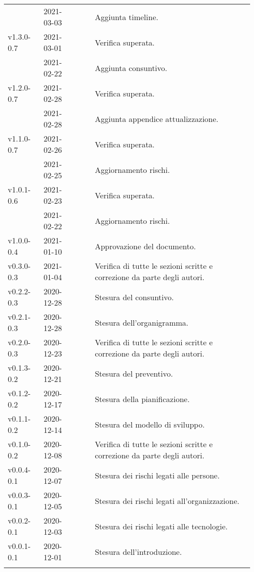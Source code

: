 {\begin{longtable}{C{.131777\freewidth} C{.134036\freewidth} C{.263554\freewidth} C{.188254\freewidth} C{.282379\freewidth}}
		& 2021-03-03 & \Daniele{} & \ana{} & Aggiunta timeline. \\
		v1.3.0-0.7 & 2021-03-01 & \Giosue{} & \ver{} & Verifica superata. \\
		& 2021-02-22 & \Daniele{} & \ana{} & Aggiunta consuntivo. \\
		v1.2.0-0.7 & 2021-02-28 & \Davide{} & \ana{} & Verifica superata. \\
		& 2021-02-28 & \Lucrezia{} & \ana{} & Aggiunta appendice attualizzazione. \\
		v1.1.0-0.7 & 2021-02-26 & \Giosue{} & \ver{} & Verifica superata. \\
		 & 2021-02-25 & \Lucrezia{} & \ana{} & Aggiornamento rischi. \\
		v1.0.1-0.6 & 2021-02-23 & \Davide{} & \ver{} & Verifica superata. \\
		& 2021-02-22 & \Daniele{} & \ana{} & Aggiornamento rischi. \\
		v1.0.0-0.4 & 2021-01-10 & \Daniele{} & \RdP{} & Approvazione del documento. \\
		v0.3.0-0.3 & 2021-01-04 & \Lucrezia{} & \ver{} & Verifica di tutte le sezioni scritte e correzione da parte degli autori. \\

		v0.2.2-0.3 & 2020-12-28 & \Tommaso{} & \ana{} & Stesura del consuntivo. \\
		v0.2.1-0.3 & 2020-12-28 & \Matteo{} & \ana{} & Stesura dell'organigramma. \\

		v0.2.0-0.3 & 2020-12-23 & \Giosue{} & \ver{} & Verifica di tutte le sezioni scritte e correzione da parte degli autori. \\
		v0.1.3-0.2 & 2020-12-21 & \Tommaso{} & \ana{} & Stesura del preventivo. \\
		v0.1.2-0.2 & 2020-12-17 & \Tommaso{} & \ana{} & Stesura della pianificazione. \\
		v0.1.1-0.2 & 2020-12-14 & \Matteo{} & \ana{} & Stesura del modello di sviluppo. \\

		v0.1.0-0.2 & 2020-12-08 & \Davide & \ver{} & Verifica di tutte le sezioni scritte e correzione da parte degli autori. \\
		v0.0.4-0.1 & 2020-12-07 & \Matteo{} & \ana{} & Stesura dei rischi legati alle persone. \\
		v0.0.3-0.1 & 2020-12-05 & \Matteo{} & \ana{} & Stesura dei rischi legati all'organizzazione. \\
		v0.0.2-0.1 & 2020-12-03 & \Matteo{} & \ana{} & Stesura dei rischi legati alle tecnologie. \\
		v0.0.1-0.1 & 2020-12-01 & \Tommaso{} & \ana{} & Stesura dell'introduzione. \\
		
		\bottomrule
		\hiderowcolors
	\end{longtable}
}
